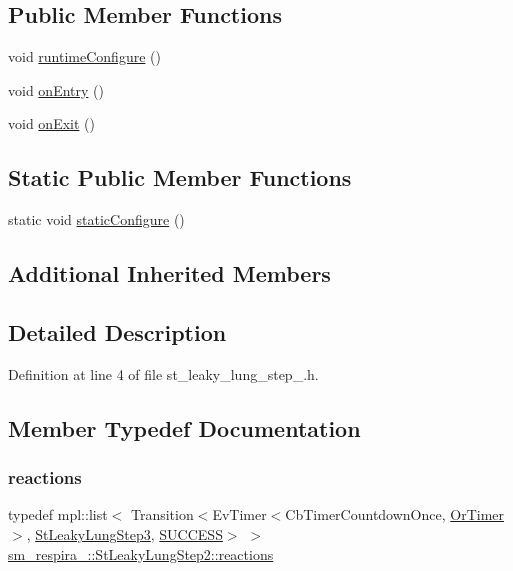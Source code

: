 \subsection*{Public Member Functions}
\begin{DoxyCompactItemize}
\item 
void \hyperlink{structsm__respira__1_1_1StLeakyLungStep2_a738290d02e5356fd5a49ae0bb5214e7e}{runtime\+Configure} ()
\item 
void \hyperlink{structsm__respira__1_1_1StLeakyLungStep2_aebc4c0d97507811a87b9eb4142a43892}{on\+Entry} ()
\item 
void \hyperlink{structsm__respira__1_1_1StLeakyLungStep2_a6f74468d8e014222e8d17d3a9f506c51}{on\+Exit} ()
\end{DoxyCompactItemize}
\subsection*{Static Public Member Functions}
\begin{DoxyCompactItemize}
\item 
static void \hyperlink{structsm__respira__1_1_1StLeakyLungStep2_a8b7e90d6934ff0806b5dec7938a734d1}{static\+Configure} ()
\end{DoxyCompactItemize}
\subsection*{Additional Inherited Members}


\subsection{Detailed Description}


Definition at line 4 of file st\+\_\+leaky\+\_\+lung\+\_\+step\+\_.\+h.



\subsection{Member Typedef Documentation}
\mbox{\label{structsm__respira__1_1_1StLeakyLungStep2_a6f3328bf0e1d12655e24a208d19ca9e2}} 
\subsubsection{\texorpdfstring{reactions}{reactions}}
{\footnotesize\ttfamily typedef mpl\+::list$<$ Transition$<$Ev\+Timer$<$Cb\+Timer\+Countdown\+Once, \hyperlink{classsm__respira__1_1_1OrTimer}{Or\+Timer}$>$, \hyperlink{structsm__respira__1_1_1StLeakyLungStep3}{St\+Leaky\+Lung\+Step3}, \hyperlink{classSUCCESS}{S\+U\+C\+C\+E\+SS}$>$ $>$ \hyperlink{structsm__respira__1_1_1StLeakyLungStep2_a6f3328bf0e1d12655e24a208d19ca9e2}{sm\+\_\+respira\+\_\+::\+St\+Leaky\+Lung\+Step2\+::reactions}}



